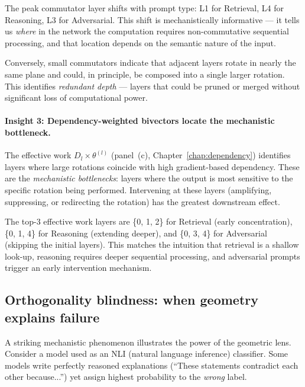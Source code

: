 \documentclass[11pt, twoside, openright]{memoir}
\numberwithin{equation}{chapter}
\begin{document}
The peak commutator layer shifts with prompt type: L1 for Retrieval,
L4 for Reasoning, L3 for Adversarial.  This shift is mechanistically
informative --- it tells us \emph{where} in the network the
computation requires non-commutative sequential processing, and that
location depends on the semantic nature of the input.

Conversely, small commutators indicate that adjacent layers rotate in
nearly the same plane and could, in principle, be composed into a
single larger rotation.  This identifies \emph{redundant depth} ---
layers that could be pruned or merged without significant loss of
computational power.

\paragraph{Insight 3: Dependency-weighted bivectors locate the
mechanistic bottleneck.}
The effective work $D_l \times \theta^{(l)}$ (panel~(c),
Chapter~\ref{chap:dependency}) identifies layers where large
rotations coincide with high gradient-based dependency.  These are
the \emph{mechanistic bottlenecks}: layers where the output is most
sensitive to the specific rotation being performed.  Intervening at
these layers (amplifying, suppressing, or redirecting the rotation)
has the greatest downstream effect.

The top-3 effective work layers are \{0, 1, 2\} for Retrieval
(early concentration), \{0, 1, 4\} for Reasoning (extending deeper),
and \{0, 3, 4\} for Adversarial (skipping the initial layers).
This matches the intuition that retrieval is a shallow look-up,
reasoning requires deeper sequential processing, and adversarial
prompts trigger an early intervention mechanism.

\subsection{Orthogonality blindness: when geometry explains failure}

A striking mechanistic phenomenon illustrates the power of the
geometric lens.  Consider a model used as an NLI (natural language
inference) classifier.  Some models write perfectly reasoned
explanations (``These statements contradict each other because...'')
yet assign highest probability to the \emph{wrong} label.
\end{document}
